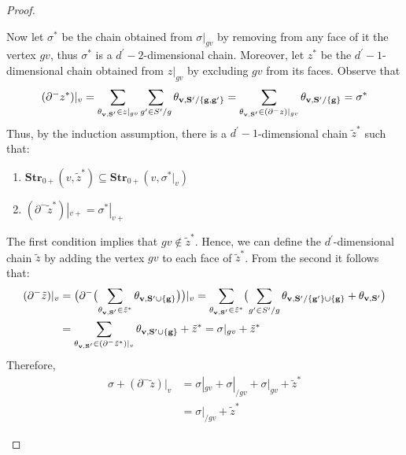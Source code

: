 \begin{proof}
\begin{enumerate}
      Now let $ \sigma^{*}$ be the chain obtained from $\sigma|_{gv}$ by removing from any face of it the vertex $gv$, thus $\sigma^{*}$ is a $d^{\prime}-2$-dimensional chain. Moreover, let $z^{*}$ be the $d^{\prime}-1$-dimensional chain obtained from $z|_{gv}$ by excluding $gv$ from its faces. Observe that 
      \begin{equation*}
        \begin{split}
          (\partial^{-} z^{*})|_{v} =  \sum_{\mathbf{\theta_{v ,S^{\prime}}{} } \in z|_{gv}}\sum_{g^{\prime} \in S^{\prime}/g}\mathbf{\theta_{v ,S^{\prime}/\{g,g^{\prime}\}} } = \sum_{\mathbf{\theta_{v ,S^{\prime}}{} } \in (\partial^{-} z)|_{gv}}\mathbf{\theta_{v ,S^{\prime}/\{g\}} } = \sigma^{*}
        \end{split}
      \end{equation*}
      Thus, by the induction assumption, there is a $d^{\prime}-1$-dimensional chain $\tilde{z}^{*}$ such that: 
  \begin{enumerate}
    \item $ \mathbf{Str}_{0+}(v, \tilde{z}^{*}) \subseteq \mathbf{Str}_{0+}(v, \sigma^{*}|_{v})$  
    \item $(\partial^{-}\tilde{z}^{*})|_{v+} = \sigma^{*}|_{v+}$
  \end{enumerate}
The first condition implies that $gv \notin \tilde{z}^{*}$. Hence, we can define the $d^{\prime}$-dimensional chain $\tilde{z}$ by adding the vertex $gv$ to each face of $\tilde{z}^{*}$. From the second it follows that: 
\begin{equation*}
  \begin{split}
    (\partial^{-} \tilde{z})|_{v} &= \bigl(\partial^{-} \bigl(  \sum_{\mathbf{\theta_{v ,S^{\prime}}{} } \in \tilde{z}^{*} } \mathbf{\theta_{v ,S^{\prime}\cup \{g\}} }  \bigr)\bigr)|_{v} =  \sum_{\mathbf{\theta_{v ,S^{\prime}}{} } \in \tilde{z}^{*} } \bigl( \sum_{g^{\prime} \in S^{\prime}/g } \mathbf{\theta_{v ,S^{\prime} / \{g^{\prime}\} \cup \{g\}} }  +   \mathbf{\theta_{v ,S^{\prime}} } \bigr)\\
    &=  \sum_{\mathbf{\theta_{v ,S^{\prime}}{} } \in (\partial^{-}\tilde{z}^{*})|_{v} } \mathbf{\theta_{v ,S^{\prime}\cup \{g\}} } + \tilde{z}^{*} = \sigma|_{gv} + \tilde{z}^{*} 
  \end{split}
\end{equation*}
Therefore, 
\begin{equation*}
  \begin{split}
    \sigma + (\partial^{-} \tilde{z})|_{v} &= \sigma|_{gv} + \sigma|_{/ gv} + \sigma|_{gv} + \tilde{z}^{*} \\ 
    &= \sigma|_{/ gv} + \tilde{z}^{*}
  \end{split}
\end{equation*}

\end{enumerate}
\end{proof}
